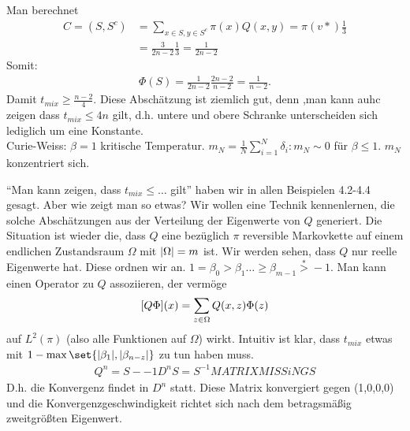  Man berechnet 
 \begin{align}
 	C =(S,S^c) &= \sum\limits_{x \in S, y\in S^c} \pi(x) Q(x,y) = \pi(v*) \frac{1}{3} \\
	 	&= \frac{3}{2n-2}\frac{1}{3} = \frac{1}{2n-2}
 \end{align}
 Somit:
 \begin{align}
 	\Phi(S) = \frac{1}{2n-2} \frac{2n-2}{n-2} = \frac{1}{n-2}.
 \end{align}
 Damit $t_{mix} \geq \frac{n-2}{4}$. Diese Abschätzung ist ziemlich gut, denn ,man kann auhc zeigen dass $t_{mix} \leq 4n$ gilt, d.h. untere und obere Schranke unterscheiden sich lediglich um eine Konstante. \\
 Curie-Weiss: $\beta =1$ kritische Temperatur. $m_N = \frac{1}{N} \sum\limits_{i=1}^{N}\delta_i : m_N \sim 0$  für $\beta \leq 1$. $m_N$ konzentriert sich. 
 
 \enquote{Man kann zeigen, dass $t_{mix} \leq \dots$ gilt} haben wir in allen Beispielen 4.2-4.4  gesagt. Aber wie zeigt man so etwas? Wir wollen eine Technik kennenlernen, die solche Abschätzungen aus der Verteilung der Eigenwerte von $Q$ generiert. Die Situation ist wieder die, dass $Q$ eine bezüglich $\pi$ reversible Markovkette auf einem endlichen Zustandsraum $\Omega$ mit $\lvert\Omega\rvert = m$ ist. Wir werden sehen, dass $Q$ nur reelle Eigenwerte hat. Diese ordnen wir an. $1 = \beta_0 > \beta_1 \dots \geq \beta_{m-1} \overset{*}{>} -1$. Man kann einen Operator zu $Q$ assoziieren, der vermöge
 \begin{align}
 	\benb{Q\Phi}(x) = \sum\limits_{z \in \Omega} Q(x,z)\Phi(z)
 \end{align}
 auf $L^2(\pi)$ (also alle Funktionen auf $\Omega$) wirkt. Intuitiv ist klar, dass $t_{mix}$ etwas mit $1 - \max\set{\abs{\beta_1},\abs{\beta_{n-z}}}$ zu tun haben muss. 
 	\begin{align}
 		Q^n = S-{-1} D^n S = S^{-1} MATRIXMISSiNG S
  	\end{align}
  	D.h. die Konvergenz findet in $D^n$ statt. Diese Matrix konvergiert gegen  (1,0,0,0) und die Konvergenzgeschwindigkeit richtet sich nach dem betragsmäßig zweitgrößten Eigenwert.
  	
